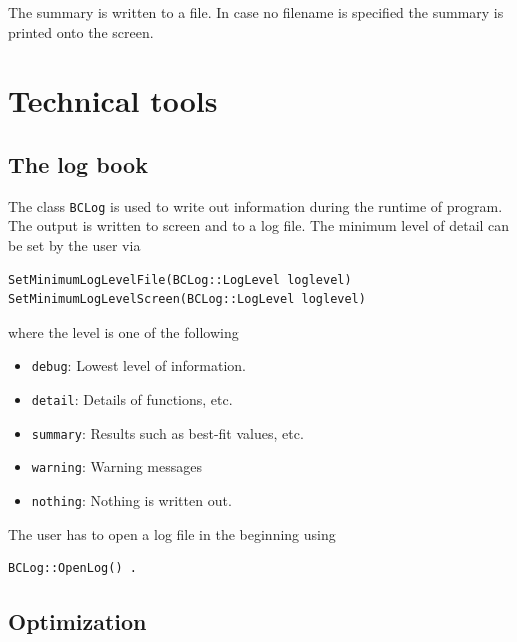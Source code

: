 \documentclass[11pt, a4paper]{article}
\begin{document}
\noindent 
The summary is written to a file. In case no filename is specified the
summary is printed onto the screen. 



\section{Technical tools} 
\label{section:tools} 


\subsection{The log book} 

The class \verb|BCLog| is used to write out information during the
runtime of program. The output is written to screen and to a log
file. The minimum level of detail can be set by the user via
%
\begin{verbatim} 
SetMinimumLogLevelFile(BCLog::LogLevel loglevel)
SetMinimumLogLevelScreen(BCLog::LogLevel loglevel)
\end{verbatim} 

\noindent 
where the level is one of the following 
%
\begin{itemize} 
\item \verb|debug|: Lowest level of information. 
\item \verb|detail|: Details of functions, etc. 
\item \verb|summary|: Results such as best-fit values, etc. 
\item \verb|warning|: Warning messages 
\item \verb|nothing|: Nothing is written out. 
\end{itemize} 

The user has to open a log file in the beginning using 
%
\begin{verbatim} 
BCLog::OpenLog() . 
\end{verbatim} 


\subsection{Optimization} 
\label{subsection:optimization} 
\end{document}
